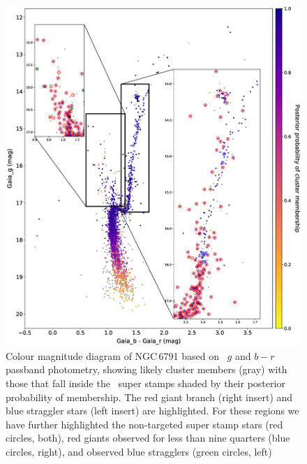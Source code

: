 \begin{figure}
\centering
\includegraphics[width=\linewidth]{Chapter4/cmd_6791.eps}
\caption[NGC\,6791 CMD]{Colour magnitude diagram of NGC\,6791 based on \Gaia~$g$ and $b-r$ passband photometry, showing likely cluster members (gray) with those that fall inside the \Kepler~super stamps shaded by their posterior probability of membership. The red giant branch (right insert) and blue straggler stars (left insert) are highlighted. For these regions we have further highlighted the non-targeted super stamp stars (red circles, both), red giants observed for less than nine quarters (blue circles, right), and observed blue stragglers (green circles, left)}
\end{figure}


